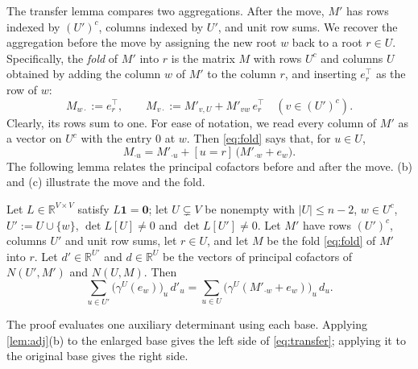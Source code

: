 \documentclass[onefignum,onetabnum,nohypdvips]{siamart250211}
\numberwithin{theorem}{section}
\numberwithin{equation}{section}
\newcommand{\R}{\mathbb{R}}
\newcommand{\one}{\mathbf{1}}
\newcommand{\zero}{\mathbf{0}}
\begin{document}
The transfer lemma compares two aggregations. After the move, $M'$
has rows indexed by $(U')^c$, columns indexed by $U'$, and unit row
sums. We recover the aggregation before the move by assigning the
new root $w$ back to a root $r\in U$.
Specifically, the \emph{fold} of $M'$ into $r$ is the matrix $M$ with
rows $U^c$ and columns $U$ obtained by adding the column $w$ of $M'$ to
the column $r$, and inserting $e_r^{\top}$ as the row of $w$:
\begin{equation}\label{eq:fold}
M_{w\cdot}:=e_r^{\top},\qquad
M_{v\cdot}:=M'_{v,U}+M'_{vw}\,e_r^{\top}\quad(v\in (U')^c).
\end{equation}
Clearly, its rows sum to one. For ease of notation, we read every
column of $M'$ as a vector on $U^c$ with the entry $0$ at $w$. Then
\eqref{eq:fold} says that, for $u\in U$,
\begin{equation}\label{eq:foldcol}
M_{\cdot u}=M'_{\cdot u}+[u=r]\,\big(M'_{\cdot w}+e_w\big).
\end{equation}
The following lemma relates the principal cofactors before and after
the move. (b) and (c) illustrate the move and the
fold.
\begin{lemma}\label{lem:transfer}
Let $L\in\R^{V\times V}$ satisfy $L\one=\zero$; let $U\subsetneq V$ be
nonempty with $|U|\le n-2$, $w\in U^c$, $U':=U\cup\{w\}$,
$\det L[U]\ne0$ and $\det L[U']\ne0$. Let $M'$ have rows $(U')^c$,
columns $U'$ and unit row sums, let $r\in U$, and let $M$ be the fold
\eqref{eq:fold} of $M'$ into $r$. Let $d'\in\R^{U'}$ and $d\in\R^{U}$
be the vectors of principal cofactors of $N(U',M')$ and $N(U,M)$. Then
\begin{equation}\label{eq:transfer}
\sum_{u\in U'}\big(\gamma^{U}(e_w)\big)_u\,d'_u
=\sum_{u\in U}\big(\gamma^{U}(M'_{\cdot w}+e_w)\big)_u\,d_u .
\end{equation}
\end{lemma}

The proof evaluates one auxiliary determinant using each base.
Applying \cref{lem:adj}(b) to the enlarged base gives the left side of
\eqref{eq:transfer}; applying it to the original base gives the right
side.
\end{document}
